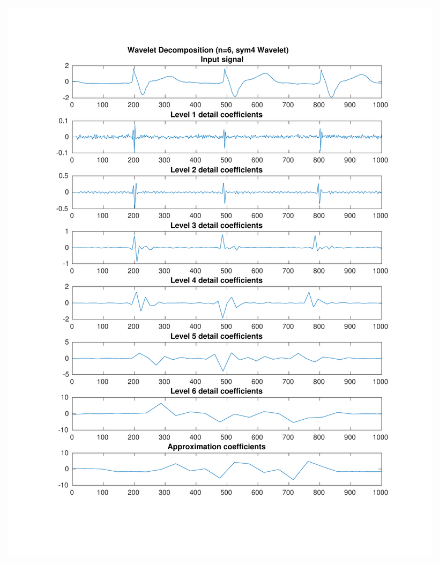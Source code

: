 \documentclass{beamer}
\begin{document}
\begin{frame}
\begin{columns}
\begin{figure}
\includegraphics[width=\textwidth]{fig/217l1_dwt2.pdf}
\end{figure}
\end{columns}
\end{frame}
\end{document}

